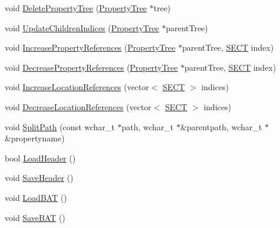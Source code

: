 \begin{DoxyCompactItemize}
\item 
void \hyperlink{class_y_compound_files_1_1_compound_file_ad37847867f946396bc545bab73f1066d}{Delete\+Property\+Tree} (\hyperlink{class_y_compound_files_1_1_compound_file_1_1_property_tree}{Property\+Tree} $\ast$tree)
\item 
void \hyperlink{class_y_compound_files_1_1_compound_file_a35140b5b01714e81a4393c73fcb22b2a}{Update\+Children\+Indices} (\hyperlink{class_y_compound_files_1_1_compound_file_1_1_property_tree}{Property\+Tree} $\ast$parent\+Tree)
\item 
void \hyperlink{class_y_compound_files_1_1_compound_file_a50ed04c43e1d286037509fa6adfe2865}{Increase\+Property\+References} (\hyperlink{class_y_compound_files_1_1_compound_file_1_1_property_tree}{Property\+Tree} $\ast$parent\+Tree, \hyperlink{_basic_excel_8hpp_a784c2e2144ab372c047faeeb0f6a9e6b}{S\+E\+C\+T} index)
\item 
void \hyperlink{class_y_compound_files_1_1_compound_file_ad41516e12f1d07dabc34ad5417380cf3}{Decrease\+Property\+References} (\hyperlink{class_y_compound_files_1_1_compound_file_1_1_property_tree}{Property\+Tree} $\ast$parent\+Tree, \hyperlink{_basic_excel_8hpp_a784c2e2144ab372c047faeeb0f6a9e6b}{S\+E\+C\+T} index)
\item 
void \hyperlink{class_y_compound_files_1_1_compound_file_a8f934ee505dddfce900b2a4310018183}{Increase\+Location\+References} (vector$<$ \hyperlink{_basic_excel_8hpp_a784c2e2144ab372c047faeeb0f6a9e6b}{S\+E\+C\+T} $>$ indices)
\item 
void \hyperlink{class_y_compound_files_1_1_compound_file_a0438368b927c0338bd659f49eb8987b9}{Decrease\+Location\+References} (vector$<$ \hyperlink{_basic_excel_8hpp_a784c2e2144ab372c047faeeb0f6a9e6b}{S\+E\+C\+T} $>$ indices)
\item 
void \hyperlink{class_y_compound_files_1_1_compound_file_a3be81d1a73f74793e3c92cb051e2c10c}{Split\+Path} (const wchar\+\_\+t $\ast$path, wchar\+\_\+t $\ast$\&parentpath, wchar\+\_\+t $\ast$\&propertyname)
\item 
bool \hyperlink{class_y_compound_files_1_1_compound_file_a83e08fdf3c056c2b7be476e16f0f9473}{Load\+Header} ()
\item 
void \hyperlink{class_y_compound_files_1_1_compound_file_a6bf0e1aa5c8f8444632e713312a2f38f}{Save\+Header} ()
\item 
void \hyperlink{class_y_compound_files_1_1_compound_file_a77153a3607417a2fd7ef84aab9193f2e}{Load\+B\+A\+T} ()
\item 
void \hyperlink{class_y_compound_files_1_1_compound_file_a6b79426b819e667dc0ba60b4969e9625}{Save\+B\+A\+T} ()

\end{DoxyCompactItemize}

